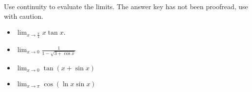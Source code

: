 Use continuity to evaluate the limits. The answer key has not been proofread, use with caution.

\begin{itemize}
\item $\displaystyle \lim_{x\to \frac{\pi}{4}} x\tan x  .$

\item $\displaystyle \lim_{x\to 0} \frac{1}{1-\sqrt{3+\cos x}}$

\item $\displaystyle \lim_{x\to 0 } \tan (x+ \sin x)$

\item $\displaystyle \lim_{x\to \pi} \cos(\ln x \sin x)$

\end{itemize}